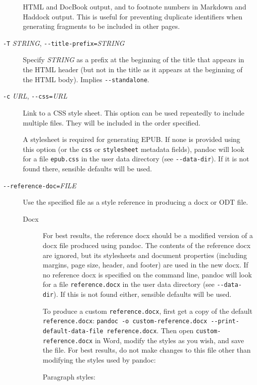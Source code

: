 \begin{description}
HTML and DocBook output, and to footnote numbers in Markdown and Haddock
output. This is useful for preventing duplicate identifiers when
generating fragments to be included in other pages.
\item[\texttt{-T} \emph{STRING},
\texttt{-\/-title-prefix=}\emph{STRING}]
Specify \emph{STRING} as a prefix at the beginning of the title that
appears in the HTML header (but not in the title as it appears at the
beginning of the HTML body). Implies \texttt{-\/-standalone}.
\item[\texttt{-c} \emph{URL}, \texttt{-\/-css=}\emph{URL}]
Link to a CSS style sheet. This option can be used repeatedly to include
multiple files. They will be included in the order specified.

A stylesheet is required for generating EPUB. If none is provided using
this option (or the \texttt{css} or \texttt{stylesheet} metadata
fields), pandoc will look for a file \texttt{epub.css} in the user data
directory (see \texttt{-\/-data-dir}). If it is not found there,
sensible defaults will be used.
\item[\texttt{-\/-reference-doc=}\emph{FILE}]
Use the specified file as a style reference in producing a docx or ODT
file.

\begin{description}
\item[Docx]
For best results, the reference docx should be a modified version of a
docx file produced using pandoc. The contents of the reference docx are
ignored, but its stylesheets and document properties (including margins,
page size, header, and footer) are used in the new docx. If no reference
docx is specified on the command line, pandoc will look for a file
\texttt{reference.docx} in the user data directory (see
\texttt{-\/-data-dir}). If this is not found either, sensible defaults
will be used.

To produce a custom \texttt{reference.docx}, first get a copy of the
default \texttt{reference.docx}:
\texttt{pandoc\ -o\ custom-reference.docx\ -\/-print-default-data-file\ reference.docx}.
Then open \texttt{custom-reference.docx} in Word, modify the styles as
you wish, and save the file. For best results, do not make changes to
this file other than modifying the styles used by pandoc:

Paragraph styles:


\end{description}
\end{description}
